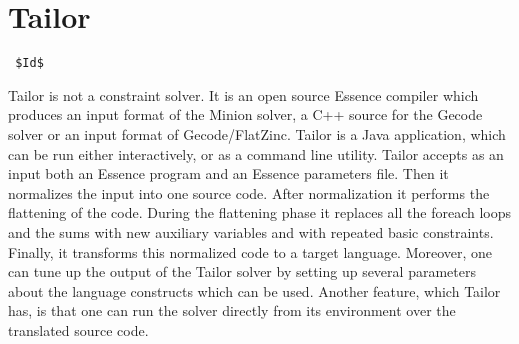 \section{Tailor}
\label{tailor}
\verb= $Id$ =

Tailor is not a constraint solver. It is an open source Essence compiler which produces an input
format of the Minion solver, a C++ source for the Gecode solver or an input format of Gecode/FlatZinc.
Tailor is a Java application, which can be run either interactively, or as a
command line utility. Tailor accepts as an input both an Essence program and an Essence parameters file.
Then it normalizes the input into one source code. After normalization it performs the 
flattening of the code. During the flattening phase it replaces all the foreach loops and the sums
with new auxiliary variables and with repeated basic constraints. Finally, it transforms this normalized 
code to a target language. Moreover, one can tune up the output of the Tailor solver by setting up several 
parameters about the language constructs which can be used. Another feature, which Tailor has, is that one 
can run the solver directly from its environment over the translated source code.